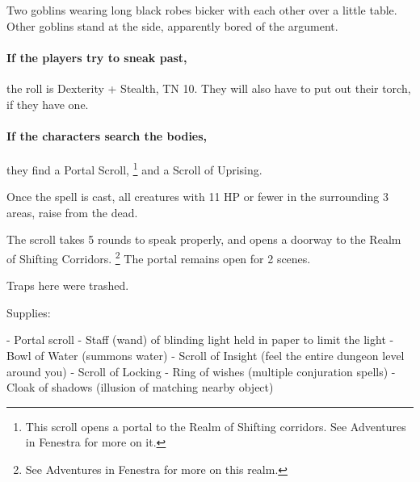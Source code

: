 \begin{multicols}{2}
\begin{boxtext}
	Two goblins wearing long black robes bicker with each other over a little table.
	Other goblins stand at the side, apparently bored of the argument.

\end{boxtext}

\paragraph{If the players try to sneak past,}
the roll is Dexterity + Stealth, TN 10.
They will also have to put out their torch, if they have one.

\paragraph{If the characters search the bodies,}
they find a Portal Scroll,%
\footnote{This scroll opens a portal to the Realm of Shifting corridors. See Adventures in Fenestra for more on it.}%
 and a Scroll of Uprising.


Once the spell is cast, all creatures with 11 HP or fewer in the surrounding 3 areas, raise from the dead.


The scroll takes 5 rounds to speak properly, and opens a doorway to the Realm of Shifting Corridors.%
\footnote{See Adventures in Fenestra for more on this realm.}
The portal remains open for 2 scenes.





Traps here were trashed.

Supplies:

- Portal scroll
- Staff (wand) of blinding light held in paper to limit the light
- Bowl of Water (summons water)
- Scroll of Insight (feel the entire dungeon level around you)
- Scroll of Locking
- Ring of wishes (multiple conjuration spells)
- Cloak of shadows (illusion of matching nearby object)

\goblinnuramancer

\goblin



\end{multicols}
